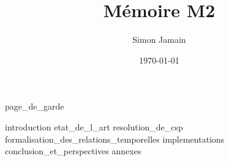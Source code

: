 \documentclass{report}
\title{Mémoire M2}
\author{Simon Jamain}
\date{\today}
\begin{document}
{page_de_garde}

\tableofcontents

{introduction}
{etat_de_l_art}
{resolution_de_csp}
{formalisation_des_relations_temporelles}
{implementations}
{conclusion_et_perspectives}
{annexes}
%
%

\printbibliography
\end{document}

